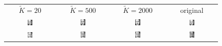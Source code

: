 \begin{figure}[ht]
	\centering
	\begin{tabular}{cccc}
		$\tilde K=20$ & $\tilde K=500$ & $\tilde K=2000$ & original \\
		\includegraphics[width=0.1\textwidth]{images/compression/mona_lisa_20} &
		\includegraphics[width=0.1\textwidth]{images/compression/mona_lisa_200} &
		\includegraphics[width=0.1\textwidth]{images/compression/mona_lisa_2000} & \includegraphics[width=0.1\textwidth]{images/compression/mona_lisa} \\
		\includegraphics[width=0.1\textwidth]{images/compression/queen_elizabeth_20} &
		\includegraphics[width=0.1\textwidth]{images/compression/queen_elizabeth_200} &
		\includegraphics[width=0.1\textwidth]{images/compression/queen_elizabeth_2000} & \includegraphics[width=0.1\textwidth]{images/compression/queen_elizabeth} \\

\end{tabular}
\end{figure}

